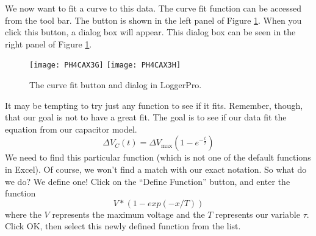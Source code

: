 We now want to fit a curve to
this data. The curve fit function can be accessed from the tool bar. The button
is shown in the left panel of Figure \ref{fig:curvefit}. When you click this
button, a dialog box will appear. This dialog box can be seen in the right
panel of Figure \ref{fig:curvefit}.

\begin{figure}[htbp!]
	\centering
\texttt{[image: PH4CAX3G]}
\texttt{[image: PH4CAX3H]}
	\caption{The curve fit button and dialog in LoggerPro.}
	\label{fig:curvefit}
\end{figure}

It may be tempting to try just any function to see if it fits. 
Remember, though, that our goal is
not to have a great fit. The goal is to see if our data fit the equation
from our capacitor model. 
\begin{equation*}
\Delta V_{C}\left( t\right) =\Delta V_{\max }\left( 1-e^{-\frac{t}{\tau }%
}\right)
\end{equation*}%
We need to find this particular function (which is not one of the default
functions in Excel).
Of course, we won't find a match
with our exact notation. So what do we do? We define one!
Click on the ``Define Function'' button, and enter the function
\begin{equation*}
	V*(1-exp(-x/T))
\end{equation*}
where the $V$ represents the maximum voltage and the $T$ represents our variable $\tau$.
Click OK, then select this newly defined function from the list.

